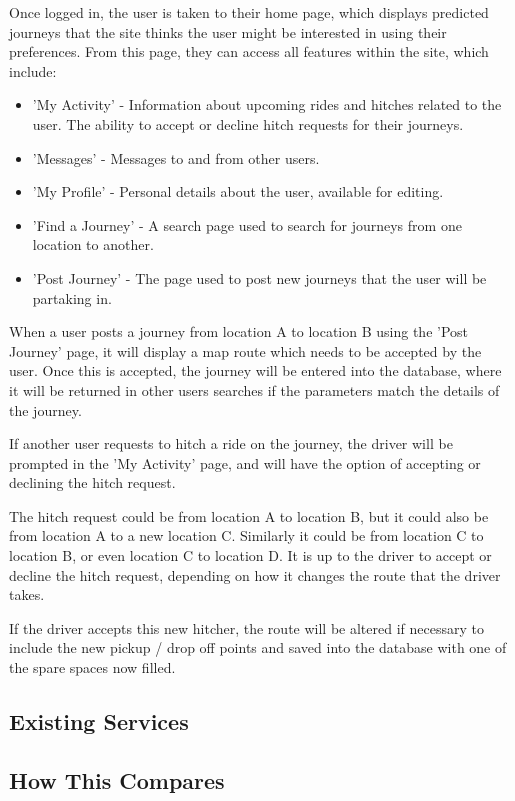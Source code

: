\documentclass[11pt]{article}
\begin{document}
	Once logged in, the user is taken to their home page, which displays predicted journeys that the site thinks the user might be interested in using their preferences. From this page, they can access all features within the site, which include:
	\begin{itemize}
		\item 'My Activity' - Information about upcoming rides and hitches related to the user. The ability to accept or decline hitch requests for their journeys.
		\item 'Messages' - Messages to and from other users.
		\item 'My Profile' - Personal details about the user, available for editing.
		\item 'Find a Journey' - A search page used to search for journeys from one location to another.
		\item 'Post Journey' - The page used to post new journeys that the user will be partaking in.		
	\end{itemize}
	
	When a user posts a journey from location A to location B using the 'Post Journey' page, it will display a map route which needs to be accepted by the user. Once this is accepted, the journey will be entered into the database, where it will be returned in other users searches if the parameters match the details of the journey.
	
	If another user requests to hitch a ride on the journey, the driver will be prompted in the 'My Activity' page, and will have the option of accepting or declining the hitch request. 
	
	The hitch request could be from location A to location B, but it could also be from location A to a new location C. Similarly it could be from location C to location B, or even location C to location D. It is up to the driver to accept or decline the hitch request, depending on how it changes the route that the driver takes.
	
	If the driver accepts this new hitcher, the route will be altered if necessary to include the new pickup / drop off points and saved into the database with one of the spare spaces now filled. 
	
	\subsection{Existing Services}
	\subsection{How This Compares}
	
\end{document}
